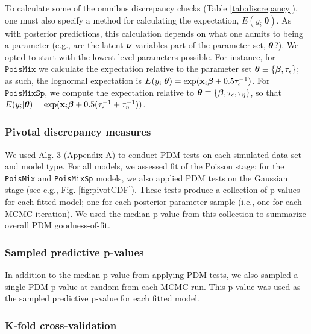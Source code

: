 \documentclass[12pt,english]{article}
\begin{document}
\begin{spacing}{1.9}
To calculate some of the omnibus discrepancy checks (Table
\ref{tab:discrepancy}), one must also specify a method for calculating
the expectation, $E(y_i|\boldsymbol{\theta})$.  As with posterior
predictions, this calculation depends on what one admits to being a
parameter (e.g., are the latent $\boldsymbol{\nu}$ variables part of the
parameter set, $\boldsymbol{\theta}$?).  We opted to start with the lowest level
parameters possible.  For instance, for $\texttt{PoisMix}$ we
calculate the expectation relative to the parameter set
$\boldsymbol{\theta} \equiv \{ \boldsymbol{\beta}, \tau_\epsilon \}$; as such, the
lognormal expectation is
$E(y_i|\boldsymbol{\theta}) = \exp({\bf x}_i \boldsymbol{\beta} + 0.5
\tau_\epsilon^{-1})$.
For $\texttt{PoisMixSp}$, we compute the
expectation relative to
$\boldsymbol{\theta} \equiv \{ \boldsymbol{\beta}, \tau_\epsilon, \tau_\eta \}$, so that
$E(y_i|\boldsymbol{\theta}) = \exp({\bf x}_i \boldsymbol{\beta} + 0.5
(\tau_\epsilon^{-1} + \tau_\eta^{-1}))$.

\subsubsection{Pivotal discrepancy measures}

We used Alg. 3 (Appendix A) to conduct PDM tests on each simulated
data set and model type.  For all models, we assessed fit of the
Poisson stage; for the \texttt{PoisMix} and \texttt{PoisMixSp} models,
we also applied PDM tests on the Gaussian stage (see e.g.,
Fig. \ref{fig:pivotCDF}).  These tests produce a collection of
p-values for each fitted model; one for each posterior parameter sample (i.e., one for each MCMC iteration).  We used the median
p-value from this collection to summarize overall PDM goodness-of-fit.

\subsubsection{Sampled predictive p-values}

In addition to the median p-value from applying PDM tests, we also
sampled a single PDM p-value at random from each MCMC run.  This
p-value was used as the sampled predictive p-value for each fitted
model.

\subsubsection{K-fold cross-validation}


\end{spacing}
\end{document}
